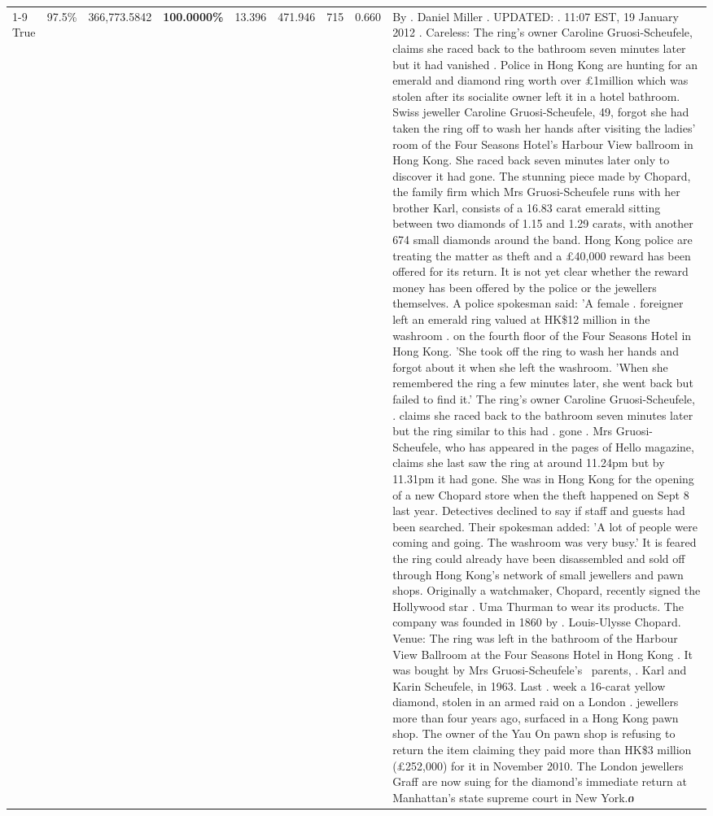 \begin{table}[H]
\begin{tabular}{lllrlllll}
\cline{1-9}
True & 97.5\% & 366,773.5842 & \bfseries \color{red} 100.0000\% & 13.396 & 471.946 & 715 & 0.660 & By . Daniel Miller . UPDATED: . 11:07 EST, 19 January 2012 . Careless: The ring's owner Caroline Gruosi-Scheufele, claims she raced back to the bathroom seven minutes later but it had vanished . Police in Hong Kong are hunting for an emerald and diamond ring worth over £1million which was stolen after its socialite owner left it in a hotel bathroom. Swiss jeweller Caroline Gruosi-Scheufele, 49, forgot she had taken the ring off to wash her hands after visiting the ladies' room of the Four Seasons Hotel's Harbour View ballroom in Hong Kong. She raced back seven minutes later only to discover it had gone. The stunning piece made by Chopard, the family firm which Mrs Gruosi-Scheufele runs with her brother Karl, consists of a 16.83 carat emerald sitting between two diamonds of 1.15 and 1.29 carats, with another 674 small diamonds around the band. Hong Kong police are treating the matter as theft and a £40,000 reward has been offered for its return. It is not yet clear whether the reward money has been offered by the police or the jewellers themselves. A police spokesman said: 'A female . foreigner left an emerald ring valued at HK\$12 million in the washroom . on the fourth floor of the Four Seasons Hotel in Hong Kong. 'She took off the ring to wash her hands and forgot about it when she left the washroom. 'When she remembered the ring a few minutes later, she went back but failed to find it.' The ring's owner Caroline Gruosi-Scheufele, . claims she raced back to the bathroom seven minutes later but the ring similar to this had . gone . Mrs Gruosi-Scheufele, who has appeared in the pages of Hello magazine, claims she last saw the ring at around 11.24pm but by 11.31pm it had gone. She was in Hong Kong for the opening of a new Chopard store when the theft happened on Sept 8 last year. Detectives declined to say if staff and guests had been searched. Their spokesman added: 'A lot of people were coming and going. The washroom was very busy.' It is feared the ring could already have been disassembled and sold off through Hong Kong's network of small jewellers and pawn shops. Originally a watchmaker, Chopard, recently signed the Hollywood star . Uma Thurman to wear its products. The company was founded in 1860 by . Louis-Ulysse Chopard. Venue: The ring was left in the bathroom of the Harbour View Ballroom at the Four Seasons Hotel in Hong Kong . It was bought by Mrs Gruosi-Scheufele's  parents, . Karl and Karin Scheufele, in 1963. Last . week a 16-carat yellow diamond, stolen in an armed raid on a London . jewellers more than four years ago, surfaced in a Hong Kong pawn shop. The owner of the Yau On pawn shop is refusing to return the item claiming they paid more than HK\$3 million (£252,000) for it in November 2010. The London jewellers Graff are now suing for the diamond’s immediate return at Manhattan’s state supreme court in New York.ዐ \\

\end{tabular}
\end{table}
